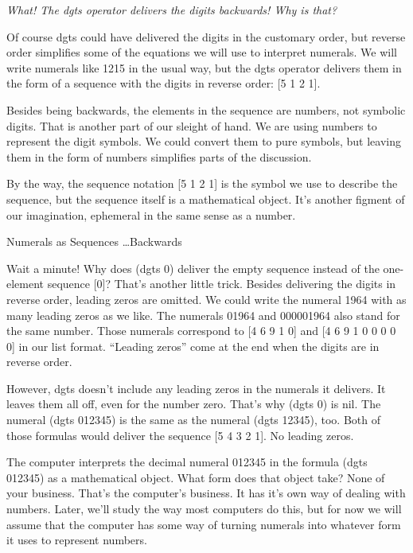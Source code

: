 \begin{aside}
\emph{What! The dgts operator delivers the digits backwards! Why is that?}

Of course
dgts
could have delivered the digits in the
customary order, but reverse order simplifies some of the
equations we will use to interpret numerals.
We will write numerals like 1215 in the usual way, but
the dgts operator delivers them in the form of
a sequence with the digits in reverse order: [5 1 2 1].

Besides being backwards, the elements in the sequence are numbers,
not symbolic digits.
That is another part of our sleight of hand.
We are using numbers to represent the digit symbols.
We could convert them to pure symbols,
but leaving them in the form of numbers
simplifies parts of the discussion.

By the way, the sequence notation [5 1 2 1] is the symbol we use
to describe the sequence,
but the sequence itself is a mathematical object.
It's another figment of our imagination,
ephemeral in the same sense as a number.
\caption{Numerals as Sequences \dots Backwards}
\label{numeral-as-sequence}
\end{aside}

Wait a minute!
Why does (dgts 0) deliver the empty sequence instead of the one-element sequence [0]?
That's another little trick.
Besides delivering the digits in reverse order, 
leading zeros are omitted.
We could write the numeral 1964 with as many leading zeros as we like.
The numerals 01964 and 000001964 also stand for the same number.
Those numerals correspond to [4 6 9 1 0] and [4 6 9 1 0 0 0 0 0] in
our list format. ``Leading zeros'' come at the end when the
digits are in reverse order.

However, dgts doesn't include any
 leading zeros
in the numerals it delivers.
It leaves them all off, even for the number zero.
That's why (dgts 0) is nil.
The numeral (dgts 012345) is the same as the numeral (dgts 12345), too.
Both of those formulas would deliver the sequence [5 4 3 2 1].
No leading zeros.

The computer interprets the decimal numeral 012345 in the formula (dgts 012345)
as a mathematical object.
What form does that object take? None of your business.
That's the computer's business.
It has it's own way of dealing with numbers.
Later, we'll study the way most computers do this,
but for now we will assume that the computer has some way of turning
numerals into whatever form it uses to represent numbers.

